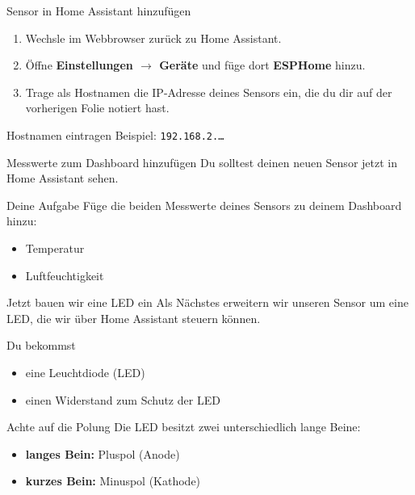 \documentclass[11pt,aspectratio=169]{beamer}
\begin{document}
\begin{frame}{Sensor in Home Assistant hinzufügen}
  \begin{enumerate}
    \item Wechsle im Webbrowser zurück zu Home Assistant.
    \item Öffne \textbf{Einstellungen $\rightarrow$ Geräte} und füge dort
      \textbf{ESPHome} hinzu.
    \item Trage als Hostnamen die IP-Adresse deines Sensors ein, die du dir
      auf der vorherigen Folie notiert hast.
  \end{enumerate}

  \vspace{1em}

  \begin{block}{Hostnamen eintragen}
    Beispiel: \texttt{192.168.2.\ldots}
  \end{block}
\end{frame}

\begin{frame}{Messwerte zum Dashboard hinzufügen}
  Du solltest deinen neuen Sensor jetzt in Home Assistant sehen.

  \vspace{1em}

  \begin{block}{Deine Aufgabe}
    Füge die beiden Messwerte deines Sensors zu deinem Dashboard hinzu:
    \begin{itemize}
      \item Temperatur
      \item Luftfeuchtigkeit
    \end{itemize}
  \end{block}
\end{frame}

\begin{frame}{Jetzt bauen wir eine LED ein}
  Als Nächstes erweitern wir unseren Sensor um eine LED, die wir über
  Home Assistant steuern können.

  \vspace{1em}

  \begin{block}{Du bekommst}
    \begin{itemize}
      \item eine Leuchtdiode (LED)
      \item einen Widerstand zum Schutz der LED
    \end{itemize}
  \end{block}

  \begin{alertblock}{Achte auf die Polung}
    Die LED besitzt zwei unterschiedlich lange Beine:
    \begin{itemize}
      \item \textbf{langes Bein:} Pluspol (Anode)
      \item \textbf{kurzes Bein:} Minuspol (Kathode)
    \end{itemize}
  \end{alertblock}
\end{frame}
\end{document}
